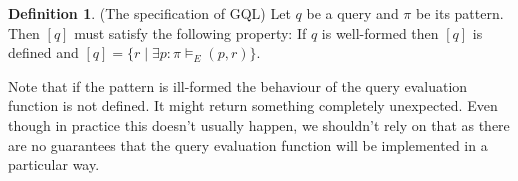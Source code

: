 \documentclass[14pt]{constructor-thesis}
\theoremstyle{definition}
\newtheorem{definition}{Definition}
\begin{document}
\begin{definition}(The specification of GQL)
  \label{def:specification-of-gql}
  Let $q$ be a query and $\pi$ be its pattern. Then $[q]$ must satisfy the following property:
  If $q$ is well-formed then $[q]$ is defined and $[q] = \{ r \mid \exists p : \pi \models_E (p, r) \}$.
\end{definition}




Note that if the pattern is ill-formed the behaviour of the query evaluation function is not defined. It might return something completely unexpected. Even though in practice this doesn't usually happen, we shouldn't rely on that as there are no guarantees that the query evaluation function will be implemented in a particular way.
\end{document}
